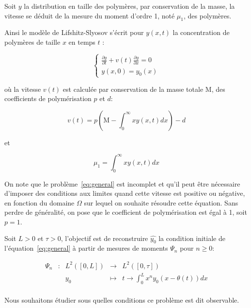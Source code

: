 \documentclass[a4paper]{article}
\newcommand{\mass}{\mathrm{M}}
\newcommand{\pol}{p}
\newcommand{\dep}{d}
\begin{document}
Soit $y$ la distribution en taille des polymères, 
par conservation de la masse,
la vitesse se déduit de la mesure du moment d'ordre 1, noté $\mu_1$, des polymères.

Ainsi le modèle de Lifshitz-Slyosov s'écrit pour $y(x,t)$ la concentration de polymères de taille $x$ en temps $t$ :

\begin{equation}
\label{eq:general}
\begin{cases}
 \displaystyle \frac{\partial y}{\partial t}+ v(t) \frac{\partial y} {\partial x}  = 0  \\
 y(x,0) = y_{0} (x) 
\end{cases}
\end{equation}

où la vitesse $v(t)$ est calculée par conservation de la masse totale $\mass$, des coefficients de polymérisation $\pol$ et $\dep$:

\[
v(t) = \pol(\mass - \int_0 ^\infty x y(x,t) dx)-\dep
\]

et 

\[
\mu_1 = \int_0 ^\infty x y(x,t) dx
\]

 On note que le problème~\eqref{eq:general} est incomplet et qu'il peut être nécessaire d'imposer des conditions aux limites quand cette vitesse est positive ou négative, en fonction du domaine $\Omega$ sur lequel on souhaite résoudre cette équation.
Sans perdre de généralité, 
on pose que le coefficient de polymérisation est égal à 1, 
soit $\pol =1$.

Soit $L>0$ et $\tau>0$, l'objectif est de reconstruire $\hat{y_0}$ 
la condition initiale de l'équation~\eqref{eq:general} 
à partir de mesures de moments $\Psi_n$ pour $n \geq 0$:

 \begin{equation}
	\begin{array}{ccccc}
	\Psi_n & : & L^2([0,L]) & \to & L^2([0,\tau]) \\
	 & & y_0 & \mapsto & t \to \int_0^L x^n y_0(x-\theta(t)) dx\\
	\end{array}
\end{equation}

Nous souhaitons étudier sous quelles conditions ce problème est dit observable.


\end{document}
